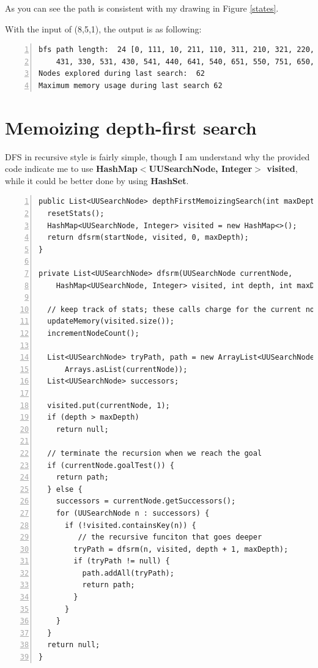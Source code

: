 \documentclass{article}
\begin{document}
As you can see the path is consistent with my drawing in Figure \ref{states}.

With the input of (8,5,1), the output is as following:

\begin{lstlisting}[numbers=left]
bfs path length:  24 [0, 111, 10, 211, 110, 311, 210, 321, 220, 421, 320,
	431, 330, 531, 430, 541, 440, 641, 540, 651, 550, 751, 650, 851]
Nodes explored during last search:  62
Maximum memory usage during last search 62
\end{lstlisting}













\section{Memoizing depth-first search}

DFS in recursive style is fairly simple, though I am understand why the provided code indicate me to use \textbf{HashMap$<$UUSearchNode, Integer$>$ visited}, while it could be better done by using \textbf{HashSet}. 

\begin{lstlisting}[numbers=left]
public List<UUSearchNode> depthFirstMemoizingSearch(int maxDepth) {
  resetStats();
  HashMap<UUSearchNode, Integer> visited = new HashMap<>();
  return dfsrm(startNode, visited, 0, maxDepth);
}

private List<UUSearchNode> dfsrm(UUSearchNode currentNode,
    HashMap<UUSearchNode, Integer> visited, int depth, int maxDepth) {

  // keep track of stats; these calls charge for the current node
  updateMemory(visited.size());
  incrementNodeCount();
  
  List<UUSearchNode> tryPath, path = new ArrayList<UUSearchNode>(
      Arrays.asList(currentNode));
  List<UUSearchNode> successors;

  visited.put(currentNode, 1);
  if (depth > maxDepth)
    return null;      
  
  // terminate the recursion when we reach the goal
  if (currentNode.goalTest()) {
    return path;
  } else {
    successors = currentNode.getSuccessors();
    for (UUSearchNode n : successors) {
      if (!visited.containsKey(n)) {
      	 // the recursive funciton that goes deeper
        tryPath = dfsrm(n, visited, depth + 1, maxDepth);
        if (tryPath != null) {
          path.addAll(tryPath);
          return path;
        }
      }
    }
  }
  return null;
}
\end{lstlisting}
\end{document}
